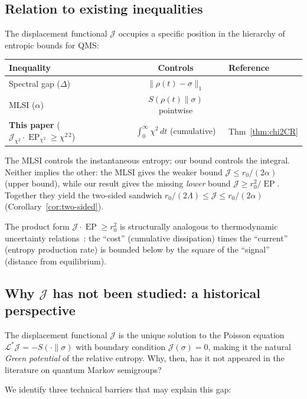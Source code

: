\documentclass[11pt,a4paper]{article}
\theoremstyle{definition}
\theoremstyle{remark}
\DeclareMathOperator{\EP}{EP}
\newcommand{\LL}{\mathcal{L}}
\newcommand{\norm}[1]{\lVert #1 \rVert}
\newcommand{\Jchi}{\mathcal{J}_{\chi^2}}
\newcommand{\EPchi}{\EP_{\chi^2}}
\begin{document}
\subsection{Relation to existing inequalities}

The displacement functional $\mathcal{J}$ occupies a specific
position in the hierarchy of entropic bounds for QMS:
\begin{center}
\begin{tabular}{@{}lcl@{}}
\toprule
Inequality & Controls & Reference \\
\midrule
Spectral gap ($\Delta$) & $\norm{\rho(t)-\sigma}_1$ & \cite{Spohn1977} \\
MLSI ($\alpha$) & $S(\rho(t)\|\sigma)$ pointwise & \cite{KastoryanoTemme2013} \\
\textbf{This paper} ($\Jchi\cdot\EPchi \ge \chi^{2\,2}$) &
$\int_0^\infty \chi^2\,dt$ (cumulative) & Thm~\ref{thm:chi2CR} \\
\bottomrule
\end{tabular}
\end{center}
The MLSI controls the instantaneous entropy; our bound controls the
integral.  Neither implies the other: the MLSI gives the weaker
bound $\mathcal{J} \le r_0/(2\alpha)$ (upper bound), while our
result gives the missing \emph{lower} bound
$\mathcal{J} \ge r_0^2/\EP$.  Together they yield the two-sided
sandwich $r_0/(2\Lambda) \le \mathcal{J} \le r_0/(2\alpha)$
(Corollary~\ref{cor:two-sided}).

The product form $\mathcal{J}\cdot\EP \ge r_0^2$ is structurally
analogous to thermodynamic uncertainty
relations~\cite{Barato2015,Gingrich2016,Horowitz2020}: the ``cost'' (cumulative
dissipation) times the ``current'' (entropy production rate) is
bounded below by the square of the ``signal'' (distance from
equilibrium).

\subsection{Why $\mathcal{J}$ has not been studied: a historical perspective}

The displacement functional $\mathcal{J}$ is the unique solution to the Poisson equation
$\LL^*\mathcal{J} = -S(\cdot\|\sigma)$ with boundary condition $\mathcal{J}(\sigma) = 0$,
making it the natural \emph{Green potential} of the relative entropy.
Why, then, has it not appeared in the literature on quantum Markov semigroups?

We identify three technical barriers that may explain this gap:
\end{document}
